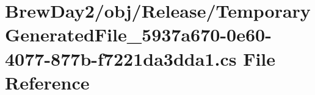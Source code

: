 \hypertarget{_brew_day2_2obj_2_release_2_temporary_generated_file__5937a670-0e60-4077-877b-f7221da3dda1_8cs}{}\section{Brew\+Day2/obj/\+Release/\+Temporary\+Generated\+File\+\_\+5937a670-\/0e60-\/4077-\/877b-\/f7221da3dda1.cs File Reference}
\label{_brew_day2_2obj_2_release_2_temporary_generated_file__5937a670-0e60-4077-877b-f7221da3dda1_8cs}
